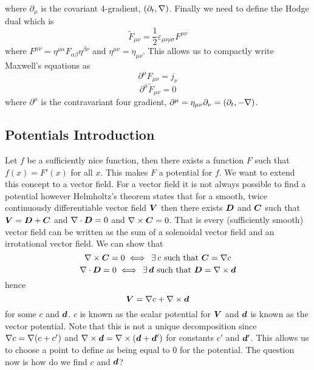 \documentclass{article}
\begin{document}
    where \(\partial_\mu\) is the covariant 4-gradient, \((\partial_t, \nabla)\).
    Finally we need to define the Hodge dual which is
    \[\tilde{F}_{\mu\nu} = \frac{1}{2}\varepsilon_{\mu\nu\rho\sigma}F^{\mu\nu}\]
    where \(F^{\mu\nu} = \eta^{\mu\alpha}F_{\alpha\beta}\eta^{\beta\nu}\) and \(\eta^{\mu\nu} = \eta_{\mu\nu}\).
    This allows us to compactly write Maxwell's equations as
    \[\partial^\mu F_{\mu\nu} = j_\nu\]
    \[\partial^\mu \tilde F_{\mu\nu} = 0\]
    where \(\partial^\mu\) is the contravariant four gradient, \(\partial^\mu = \eta_{\mu\nu}\partial_\nu = (\partial_t, -\nabla)\).
    
    \subsection{Potentials Introduction}
    Let \(f\) be a sufficiently nice function, then there exists a function \(F\) such that \(f(x) = F'(x)\) for all \(x\).
    This makes \(F\) a potential for \(f\).
    We want to extend this concept to a vector field.
    For a vector field it is not always possible to find a potential however Helmholtz's theorem states that for a smooth, twice continuously differentiable vector field \(\bm{V}\) then there exists \(\bm{D}\) and \(\bm{C}\) such that \(\bm{V} = \bm{D} + \bm{C}\) and \(\nabla\cdot\bm{D} = 0\) and \(\nabla\times\bm{C} = 0\).
    That is every (sufficiently smooth) vector field can be written as the sum of a solenoidal vector field and an irrotational vector field.
    We can show that 
    \[\nabla\times\bm{C} = 0\iff \,\exists\, c\text{ such that }\bm{C} = \nabla c\]
    \[\nabla\cdot\bm{D} = 0 \iff \,\exists\, \bm{d}\text{ such that }\bm{D} = \nabla\times\bm{d}\]
    hence
    \[\bm{V} = \nabla c + \nabla\times\bm{d}\]
    for some \(c\) and \(\bm{d}\).
    \(c\) is known as the scalar potential for \(\bm{V}\) and \(\bm{d}\) is known as the vector potential.
    Note that this is not a unique decomposition since \(\nabla c = \nabla (c + c')\) and \(\nabla\times\bm{d} = \nabla\times(\bm{d} + \bm{d}')\) for constants \(c'\) and \(\bm{d}'\).
    This allows us to choose a point to define as being equal to 0 for the potential.
    The question now is how do we find \(c\) and \(\bm{d}\)?
    
\end{document}
